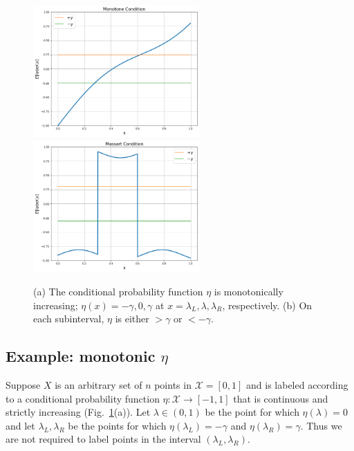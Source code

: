 \documentclass[twoside]{article}
\def\X{{\mathcal X}}
\begin{document}
\begin{figure}[t]
\begin{center}
  \includegraphics[width=2.5in]{figures/Monotone.png}
\includegraphics[width=2.5in]{figures/Massart.png}
\end{center}
\caption{(a) The conditional probability function $\eta$ is monotonically increasing; $\eta(x) = -\gamma, 0, \gamma$ at $x = \lambda_L, \lambda, \lambda_R$, respectively. (b) On each subinterval, $\eta$ is either $> \gamma$ or $<-\gamma$.}
\label{fig:oned}
\end{figure}

\subsection{Example: monotonic $\eta$}

Suppose $X$ is an arbitrary set of $n$ points in $\X = [0,1]$ and is labeled according to a conditional probability function $\eta: \X \to [-1,1]$ that is continuous and strictly increasing (Fig.~\ref{fig:oned}(a)). Let $\lambda \in (0,1)$ be the point for which $\eta(\lambda) = 0$ and let $\lambda_L, \lambda_R$ be the points for which $\eta(\lambda_L) = -\gamma$ and $\eta(\lambda_R) = \gamma$. Thus we are not required to label points in the interval $(\lambda_L, \lambda_R)$. 




\end{document}
